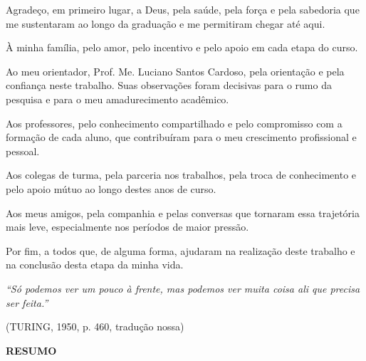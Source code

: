 \documentclass[12pt,a4paper]{extarticle}
\begin{document}
{\onehalfspacing
Agradeço, em primeiro lugar, a Deus, pela saúde, pela força e pela sabedoria que me sustentaram ao longo da graduação e me permitiram chegar até aqui.

À minha família, pelo amor, pelo incentivo e pelo apoio em cada etapa do curso.

Ao meu orientador, Prof. Me. Luciano Santos Cardoso, pela orientação e pela confiança neste trabalho. Suas observações foram decisivas para o rumo da pesquisa e para o meu amadurecimento acadêmico.

Aos professores, pelo conhecimento compartilhado e pelo compromisso com a formação de cada aluno, que contribuíram para o meu crescimento profissional e pessoal.

Aos colegas de turma, pela parceria nos trabalhos, pela troca de conhecimento e pelo apoio mútuo ao longo destes anos de curso.

Aos meus amigos, pela companhia e pelas conversas que tornaram essa trajetória mais leve, especialmente nos períodos de maior pressão.

Por fim, a todos que, de alguma forma, ajudaram na realização deste trabalho e na conclusão desta etapa da minha vida.
\par}

\newpage
\thispagestyle{empty}
\null\vfill
\begin{flushright}
\begin{minipage}{8cm}
\raggedleft
\textit{``Só podemos ver um pouco à frente, mas podemos ver muita coisa ali que precisa ser feita.''}

\vspace{0.3cm}
(TURING, 1950, p. 460, tradução nossa)
\end{minipage}
\end{flushright}

\newpage
\thispagestyle{empty}
\begin{center}
    \textbf{RESUMO}
\end{center}
\vspace{0.5cm}
\end{document}
